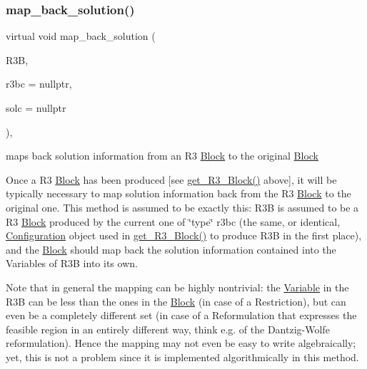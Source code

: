 \subsubsection{\texorpdfstring{map\+\_\+back\+\_\+solution()}{map\_back\_solution()}}
{\footnotesize\ttfamily virtual void map\+\_\+back\+\_\+solution (\begin{DoxyParamCaption}\item[{\mbox{\hyperlink{class_s_m_spp__di__unipi__it_1_1_block}{Block}} $\ast$}]{R3B,  }\item[{\mbox{\hyperlink{class_s_m_spp__di__unipi__it_1_1_configuration}{Configuration}} $\ast$}]{r3bc = {\ttfamily nullptr},  }\item[{\mbox{\hyperlink{class_s_m_spp__di__unipi__it_1_1_configuration}{Configuration}} $\ast$}]{solc = {\ttfamily nullptr} }\end{DoxyParamCaption})\hspace{0.3cm}{\ttfamily [inline]}, {\ttfamily [virtual]}}



maps back solution information from an R3 \mbox{\hyperlink{class_s_m_spp__di__unipi__it_1_1_block}{Block}} to the original \mbox{\hyperlink{class_s_m_spp__di__unipi__it_1_1_block}{Block}} 

Once a R3 \mbox{\hyperlink{class_s_m_spp__di__unipi__it_1_1_block}{Block}} has been produced \mbox{[}see \mbox{\hyperlink{class_s_m_spp__di__unipi__it_1_1_block_a2e682f5c0d4a74503c0cb5ab38fb6428}{get\+\_\+\+R3\+\_\+\+Block()}} above\mbox{]}, it will be typically necessary to map solution information back from the R3 \mbox{\hyperlink{class_s_m_spp__di__unipi__it_1_1_block}{Block}} to the original one. This method is assumed to be exactly this\+: R3B is assumed to be a R3 \mbox{\hyperlink{class_s_m_spp__di__unipi__it_1_1_block}{Block}} produced by the current one of \char`\"{}type\char`\"{} r3bc (the same, or identical, \mbox{\hyperlink{class_s_m_spp__di__unipi__it_1_1_configuration}{Configuration}} object used in \mbox{\hyperlink{class_s_m_spp__di__unipi__it_1_1_block_a2e682f5c0d4a74503c0cb5ab38fb6428}{get\+\_\+\+R3\+\_\+\+Block()}} to produce R3B in the first place), and the \mbox{\hyperlink{class_s_m_spp__di__unipi__it_1_1_block}{Block}} should map back the solution information contained into the Variables of R3B into its own.

Note that in general the mapping can be highly nontrivial\+: the \mbox{\hyperlink{class_s_m_spp__di__unipi__it_1_1_variable}{Variable}} in the R3B can be less than the ones in the \mbox{\hyperlink{class_s_m_spp__di__unipi__it_1_1_block}{Block}} (in case of a Restriction), but can even be a completely different set (in case of a Reformulation that expresses the feasible region in an entirely different way, think e.\+g. of the Dantzig-\/\+Wolfe reformulation). Hence the mapping may not even be easy to write algebraically; yet, this is not a problem since it is implemented algorithmically in this method.

